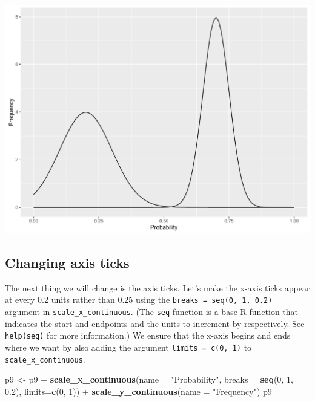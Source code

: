 \documentclass[]{article}
\newenvironment{Shaded}{\begin{snugshade}}{\end{snugshade}}
\newcommand{\KeywordTok}[1]{\textcolor[rgb]{0.13,0.29,0.53}{\textbf{{#1}}}}
\newcommand{\DataTypeTok}[1]{\textcolor[rgb]{0.13,0.29,0.53}{{#1}}}
\newcommand{\DecValTok}[1]{\textcolor[rgb]{0.00,0.00,0.81}{{#1}}}
\newcommand{\FloatTok}[1]{\textcolor[rgb]{0.00,0.00,0.81}{{#1}}}
\newcommand{\StringTok}[1]{\textcolor[rgb]{0.31,0.60,0.02}{{#1}}}
\newcommand{\NormalTok}[1]{{#1}}
\begin{document}
\begin{center}\includegraphics{0_all_posts_pdf/function_5-1} \end{center}

\subsection{Changing axis ticks}\label{changing-axis-ticks-2}

The next thing we will change is the axis ticks. Let's make the x-axis
ticks appear at every 0.2 units rather than 0.25 using the
\texttt{breaks\ =\ seq(0,\ 1,\ 0.2)} argument in
\texttt{scale\_x\_continuous}. (The \texttt{seq} function is a base R
function that indicates the start and endpoints and the units to
increment by respectively. See \texttt{help(seq)} for more information.)
We ensure that the x-axis begins and ends where we want by also adding
the argument \texttt{limits\ =\ c(0,\ 1)} to
\texttt{scale\_x\_continuous}.

\begin{Shaded}
\begin{Highlighting}[]
\NormalTok{p9 <-}\StringTok{ }\NormalTok{p9 +}\StringTok{ }\KeywordTok{scale_x_continuous}\NormalTok{(}\DataTypeTok{name =} \StringTok{"Probability"}\NormalTok{,}
                              \DataTypeTok{breaks =} \KeywordTok{seq}\NormalTok{(}\DecValTok{0}\NormalTok{, }\DecValTok{1}\NormalTok{, }\FloatTok{0.2}\NormalTok{),}
                              \DataTypeTok{limits=}\KeywordTok{c}\NormalTok{(}\DecValTok{0}\NormalTok{, }\DecValTok{1}\NormalTok{)) +}
\StringTok{      }\KeywordTok{scale_y_continuous}\NormalTok{(}\DataTypeTok{name =} \StringTok{"Frequency"}\NormalTok{)}
\NormalTok{p9}
\end{Highlighting}
\end{Shaded}
\end{document}
